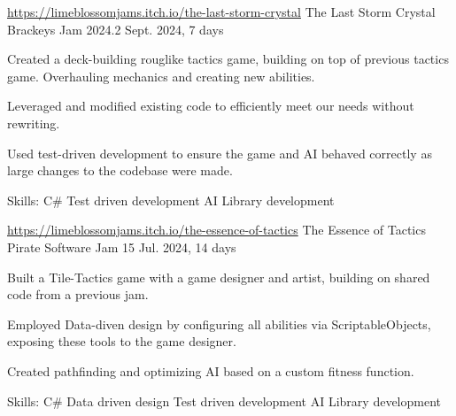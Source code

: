 

\begin{cventries}

 \cventry
  {\href{https://limeblossomjams.itch.io/the-last-storm-crystal}{https://limeblossomjams.itch.io/the-last-storm-crystal}} %
   {The Last Storm Crystal} %
   {Brackeys Jam 2024.2} %
   {Sept. 2024, 7 days} %
   {
     \begin{cvitems} %
      \item {Created a deck-building rouglike tactics game, building on top of previous tactics game. Overhauling mechanics and creating new abilities.}
      \item {Leveraged and modified existing code to efficiently meet our needs without rewriting.}
      \item {Used test-driven development to ensure the game and AI behaved correctly as large changes to the codebase were made.}
      \item {Skills: C\# \textbullet{} Test driven development \textbullet{} AI \textbullet{} Library development }
     \end{cvitems}
   }
 
  \cventry
   {\href{https://limeblossomjams.itch.io/the-essence-of-tactics}{https://limeblossomjams.itch.io/the-essence-of-tactics}} %
    {The Essence of Tactics} %
    {Pirate Software Jam 15} %
    {Jul. 2024, 14 days} %
    {
      \begin{cvitems} %
        \item {Built a Tile-Tactics game with a game designer and artist, building on shared code from a previous jam.}
        \item {Employed Data-diven design by configuring all abilities via ScriptableObjects, exposing these tools to the game designer.}
        \item {Created pathfinding and optimizing AI based on a custom fitness function.}
        \item {Skills: C\# \textbullet{} Data driven design \textbullet{} Test driven development \textbullet{} AI \textbullet{} Library development }
      \end{cvitems}
    }


\end{cventries}
